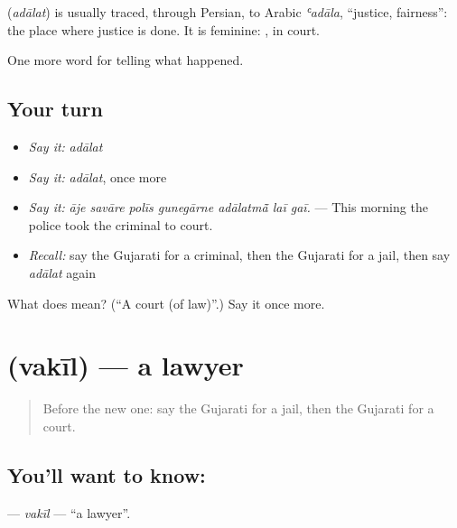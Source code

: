 \begin{cousinweb}
\textbf{} (\emph{adālat}) is usually traced, through Persian, to Arabic \emph{ʿadāla}, \textquotedblleft{}justice, fairness\textquotedblright{}: the place where justice is done. It is feminine: \textbf{}, in court.
\end{cousinweb}

\begin{grammarlens}[title={What you've built}]
One more word for telling what happened.
\end{grammarlens}

\subsection*{Your turn}
\begin{itemize}
\raggedright
  \item \emph{Say it:} \emph{adālat}
  \item \emph{Say it:} \emph{adālat}, once more
  \item \emph{Say it:} \emph{āje savāre polīs gunegārne adālatmā̃ laī gaī.} — This morning the police took the criminal to court.
  \item \emph{Recall:} say the Gujarati for a criminal, then the Gujarati for a jail, then say \emph{adālat} again
\end{itemize}

\begin{tcolorbox}[breakable,colback=teal!4,colframe=teal!35!black,title={Before you move on}]
What does  mean? (\textquotedblleft{}A court (of law)\textquotedblright{}.) Say it once more.
\end{tcolorbox}
\section[\texorpdfstring{\gu{વકીલ} (vakīl)}{વકીલ (vakīl)}]{ (vakīl) — a lawyer}

\label{lesson:GU-C289-vakil}



\begin{quote}
Before the new one: say the Gujarati for a jail, then the Gujarati for a court.
\end{quote}

\subsection*{You'll want to know: }
\textbf{} — \emph{vakīl} — \textquotedblleft{}a lawyer\textquotedblright{}.

